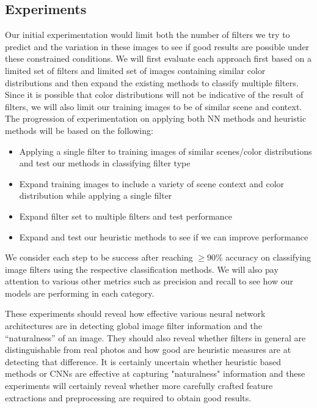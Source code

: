 \documentclass[a4paper, 11pt]{article}
\begin{document}
\subsection*{Experiments}
Our initial experimentation would limit both the number of filters we try to predict and the variation in these images to see if good results are possible under these constrained conditions. We will first evaluate each approach first based on a limited set of filters and limited set of images containing similar color distributions and then expand the existing methods to classify multiple filters. Since it is possible that color distributions will not be indicative of the result of filters, we will also limit our training images to be of similar scene and context. The progression of experimentation on applying both NN methods and heuristic methods will be based on the following:
\begin{itemize}
    \item Applying a single filter to training images of similar scenes/color distributions and test our methods in classifying filter type
    \item Expand training images to include a variety of scene context and color distribution while applying a single filter
    \item Expand filter set to multiple filters and test performance
    \item Expand and test our heuristic methods to see if we can improve performance
\end{itemize}

We consider each step to be success after reaching $\geq 90\%$ accuracy on classifying image filters using the respective classification methods. We will also pay attention to various other metrics such as precision and recall to see how our models are performing in each category.

These experiments should reveal how effective various neural network architectures are in detecting global image filter information and the ``naturalness'' of an image. They should also reveal whether filters in general are distinguishable from real photos and how good are heuristic measures are at detecting that difference. It is certainly uncertain whether heuristic based methods or CNNs are effective at capturing "naturalness" information and these experiments will certainly reveal whether more carefully crafted feature extractions and preprocessing are required to obtain good results. 
\end{document}
